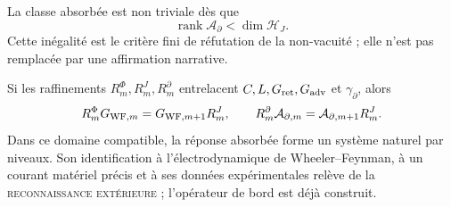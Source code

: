 La classe absorbée est non triviale dès que
\[
 \operatorname{rank}\mathcal A_\partial<\dim\mathcal H_J.
\]
Cette inégalité est le critère fini de réfutation de la non-vacuité ; elle n'est pas remplacée par
une affirmation narrative.

Si les raffinements \(R_m^\Phi,R_m^J,R_m^\partial\) entrelacent
\(C,L,G_{\rm ret},G_{\rm adv}\) et \(\gamma_\partial\), alors
\[
 R_m^\Phi G_{{\rm WF},m}
 =G_{{\rm WF},m+1}R_m^J,\qquad
 R_m^\partial\mathcal A_{\partial,m}
 =\mathcal A_{\partial,m+1}R_m^J.
\]
Dans ce domaine compatible, la réponse absorbée forme un système naturel
par niveaux. Son identification à l'électrodynamique de
Wheeler--Feynman, à un courant matériel précis et à ses données expérimentales
relève de la \textsc{reconnaissance extérieure} ; l'opérateur de bord est déjà construit.


